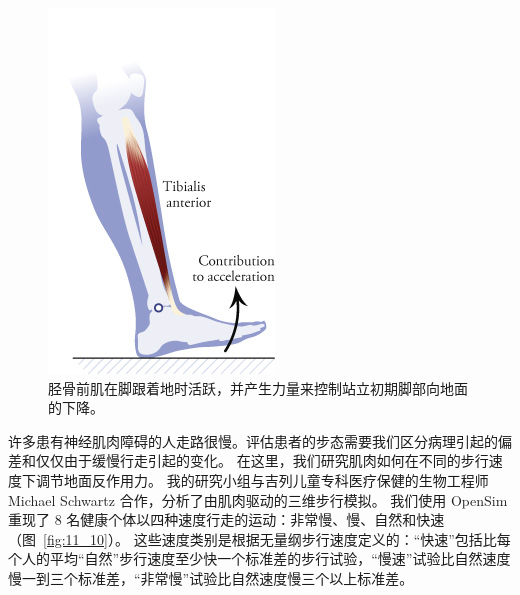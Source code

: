 \begin{figure}[!htb]
	\centering
	\includegraphics[width=0.4\linewidth]{chap11/11_9}
	\caption{胫骨前肌在脚跟着地时活跃，并产生力量来控制站立初期脚部向地面的下降。 \label{fig:11_9}}
\end{figure}


许多患有神经肌肉障碍的人走路很慢。评估患者的步态需要我们区分病理引起的偏差和仅仅由于缓慢行走引起的变化。
在这里，我们研究肌肉如何在不同的步行速度下调节地面反作用力。
我的研究小组与吉列儿童专科医疗保健的生物工程师 Michael Schwartz 合作，分析了由肌肉驱动的三维步行模拟。
我们使用 OpenSim 重现了 8 名健康个体以四种速度行走的运动：非常慢、慢、自然和快速（图~\ref{fig:11_10}）。
这些速度类别是根据无量纲步行速度定义的：“快速”包括比每个人的平均“自然”步行速度至少快一个标准差的步行试验，“慢速”试验比自然速度慢一到三个标准差，“非常慢”试验比自然速度慢三个以上标准差。

